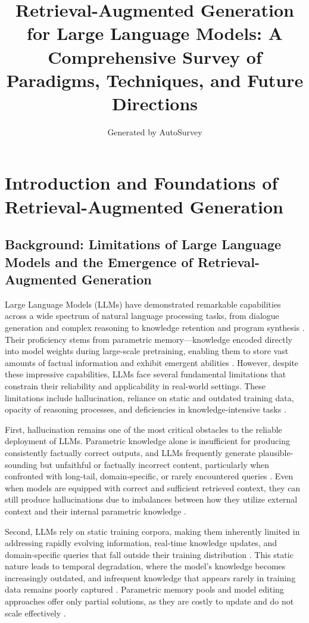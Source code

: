 \documentclass[11pt]{article}
\title{Retrieval-Augmented Generation for Large Language Models: A Comprehensive Survey of Paradigms, Techniques, and Future Directions}
\author{Generated by AutoSurvey}
\date{}
\begin{document}
\maketitle
\tableofcontents
\newpage

\section{Introduction and Foundations of Retrieval-Augmented Generation}

\subsection{Background: Limitations of Large Language Models and the Emergence of Retrieval-Augmented Generation}

Large Language Models (LLMs) have demonstrated remarkable capabilities across a wide spectrum of natural language processing tasks, from dialogue generation and complex reasoning to knowledge retention and program synthesis \cite{ref1,ref2}. Their proficiency stems from parametric memory---knowledge encoded directly into model weights during large-scale pretraining, enabling them to store vast amounts of factual information and exhibit emergent abilities \cite{ref3,ref4,ref5}. However, despite these impressive capabilities, LLMs face several fundamental limitations that constrain their reliability and applicability in real-world settings. These limitations include hallucination, reliance on static and outdated training data, opacity of reasoning processes, and deficiencies in knowledge-intensive tasks \cite{ref1,ref6}.

First, hallucination remains one of the most critical obstacles to the reliable deployment of LLMs. Parametric knowledge alone is insufficient for producing consistently factually correct outputs, and LLMs frequently generate plausible-sounding but unfaithful or factually incorrect content, particularly when confronted with long-tail, domain-specific, or rarely encountered queries \cite{ref7,ref8,ref9}. Even when models are equipped with correct and sufficient retrieved context, they can still produce hallucinations due to imbalances between how they utilize external context and their internal parametric knowledge \cite{ref10,ref11}.

Second, LLMs rely on static training corpora, making them inherently limited in addressing rapidly evolving information, real-time knowledge updates, and domain-specific queries that fall outside their training distribution \cite{ref12,ref8,ref13}. This static nature leads to temporal degradation, where the model's knowledge becomes increasingly outdated, and infrequent knowledge that appears rarely in training data remains poorly captured \cite{ref14}. Parametric memory pools and model editing approaches offer only partial solutions, as they are costly to update and do not scale effectively \cite{ref15}.
\end{document}
